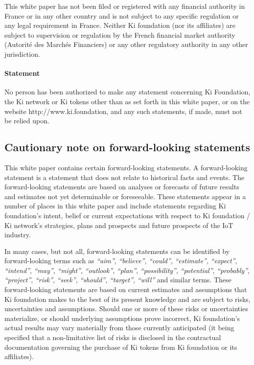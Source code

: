 This white paper has not been filed or registered with any financial authority in France or in any other country and is not subject to any specific regulation or any legal requirement in France. Neither Ki foundation (nor its affiliates) are subject to supervision or regulation by the French financial market authority (Autorité des Marchés Financiers) or any other regulatory authority in any other jurisdiction.

\paragraph{Statement}
No person has been authorized to make any statement concerning Ki Foundation, the Ki network or Ki tokens other than as set forth in this white paper, or on the website http://www.ki.foundation, and any such statements, if made, must not be relied upon.
\subsection{Cautionary note on forward-looking statements}
This white paper contains certain forward-looking statements. A forward-looking statement is a statement that does not relate to historical facts and events. The forward-looking statements are based on analyses or forecasts of future results and estimates not yet determinable or foreseeable. These statements appear in a number of places in this white paper and include statements regarding Ki foundation's intent, belief or current expectations with respect to Ki foundation / Ki network's strategies, plans and prospects and future prospects of the IoT industry.

In many cases, but not all, forward-looking statements can be identified by forward-looking terms such as \textit{``aim''}, \textit{``believe''}, \textit{``could''}, \textit{``estimate”}, \textit{``expect''}, \textit{``intend''}, \textit{``may''}, \textit{``might''}, \textit{``outlook''}, \textit{``plan''}, \textit{``possibility''}, \textit{``potential''}, \textit{``probably''}, \textit{``project''}, \textit{``risk''}, \textit{``seek''}, \textit{``should''}, \textit{``target''}, \textit{``will''} and similar terms. These forward-looking statements are based on current estimates and assumptions that Ki foundation makes to the best of its present knowledge and are subject to risks, uncertainties and assumptions. Should one or more of these risks or uncertainties materialize, or should underlying assumptions prove incorrect, Ki foundation's actual results may vary materially from those currently anticipated (it being specified that a non-limitative list of risks is disclosed in the contractual documentation governing the purchase of Ki tokens from Ki foundation or its affiliates).

